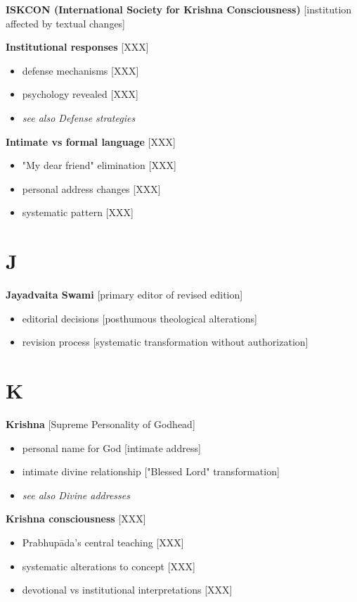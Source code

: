 \documentclass[11pt,twoside]{book}
\begin{document}
\textbf{\textbf{ISKCON (International Society for Krishna Consciousness)}} {[}institution affected by textual changes]

\textbf{\textbf{Institutional responses}} {[}XXX]
\begin{itemize}
\item defense mechanisms [XXX]
\item psychology revealed [XXX]
\item \emph{see also Defense strategies}
\end{itemize}

\textbf{\textbf{Intimate vs formal language}} {[}XXX]
\begin{itemize}
\item "My dear friend" elimination [XXX]
\item personal address changes [XXX]
\item systematic pattern [XXX]
\end{itemize}
\section*{J}
\label{sec:orgf816db0}

\textbf{\textbf{Jayadvaita Swami}} {[}primary editor of revised edition]
\begin{itemize}
\item editorial decisions [posthumous theological alterations]
\item revision process [systematic transformation without authorization]
\end{itemize}
\section*{K}
\label{sec:org2ea627d}

\textbf{\textbf{Krishna}} {[}Supreme Personality of Godhead]
\begin{itemize}
\item personal name for God [intimate address]
\item intimate divine relationship ["Blessed Lord" transformation]
\item \emph{see also Divine addresses}
\end{itemize}

\textbf{\textbf{Krishna consciousness}} {[}XXX]
\begin{itemize}
\item Prabhupāda's central teaching [XXX]
\item systematic alterations to concept [XXX]
\item devotional vs institutional interpretations [XXX]
\end{itemize}
\end{document}
